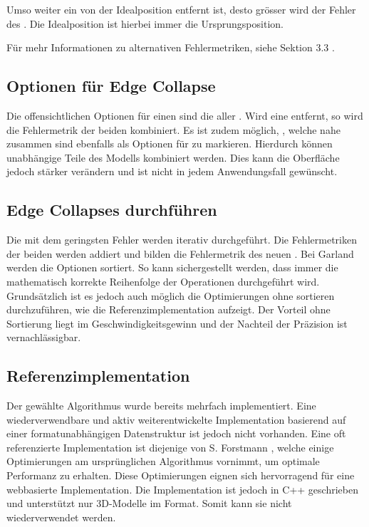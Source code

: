 Umso weiter ein  von der Idealposition entfernt ist, desto grösser wird der Fehler des . Die Idealposition ist hierbei immer die Ursprungsposition.

Für mehr Informationen zu alternativen Fehlermetriken, siehe  Sektion 3.3 \cite{quadridBasedSurfaceSimplification}.

\subsection{Optionen für Edge Collapse}

Die offensichtlichen Optionen für einen  sind die  aller . Wird eine  entfernt, so wird die Fehlermetrik der beiden  kombiniert.
Es ist zudem möglich, , welche nahe zusammen sind ebenfalls als Optionen für  zu markieren. Hierdurch können unabhängige Teile des Modells kombiniert werden. Dies kann die Oberfläche jedoch stärker verändern und ist nicht in jedem Anwendungsfall gewünscht.

\subsection{Edge Collapses durchführen}

Die  mit dem geringsten Fehler werden iterativ durchgeführt. Die Fehlermetriken der beiden  werden addiert und bilden die Fehlermetrik des neuen . Bei Garland werden die Optionen sortiert. So kann sichergestellt werden, dass immer die mathematisch korrekte Reihenfolge der Operationen durchgeführt wird. Grundsätzlich ist es jedoch auch möglich die Optimierungen ohne sortieren durchzuführen, wie die Referenzimplementation aufzeigt. Der Vorteil ohne Sortierung liegt im Geschwindigkeitsgewinn und der Nachteil der Präzision ist vernachlässigbar.

\subsection{Referenzimplementation}
Der gewählte Algorithmus wurde bereits mehrfach implementiert. Eine wiederverwendbare und aktiv weiterentwickelte Implementation basierend auf einer formatunabhängigen Datenstruktur ist jedoch nicht vorhanden. Eine oft referenzierte Implementation ist diejenige von S. Forstmann \cite{fastQuadricMeshSimplification}, welche einige Optimierungen am ursprünglichen Algorithmus vornimmt, um optimale Performanz zu erhalten. Diese Optimierungen eignen sich hervorragend für eine webbasierte Implementation. Die Implementation ist jedoch in C++ geschrieben und unterstützt nur 3D-Modelle im  Format. Somit kann sie nicht wiederverwendet werden.


